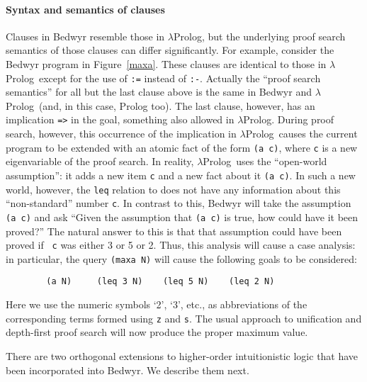 \documentclass{article}
\newcommand{\lp}{$\lambda$Prolog}
\begin{document}
\paragraph{Syntax and semantics of clauses}
Clauses in Bedwyr resemble those in \lp, but the underlying proof
search semantics of those clauses can differ significantly.  For example,
consider the Bedwyr program in Figure~\ref{maxa}.  These clauses are
identical to those in \lp\ except for the use of \verb+:=+ instead of
\verb+:-+.  Actually the ``proof search semantics'' for all but the
last clause above is the same in Bedwyr and \lp\ (and, in this case,
Prolog too).  The last clause, however, has an implication \verb+=>+
in the goal, something also allowed in \lp.  During proof search,
however, this occurrence of the implication in \lp\ causes the current
program to be extended with an atomic fact of the form \verb+(a c)+,
where {\tt c} is a new eigenvariable of the proof search.  In reality,
\lp\ uses the ``open-world assumption'': it adds a new item {\tt c}
and a new fact about it {\tt (a c)}.  In such a new world, however, the
{\tt leq} relation to does not have any information about this
``non-standard'' number {\tt c}.  In contrast to this, Bedwyr will
take the assumption  {\tt (a c)} and ask ``Given the assumption that
{\tt (a c)} is true, how could have it been proved?''  The natural
answer to this is that that assumption could have been proved if {\tt
c} was either 3 or 5 or 2.  Thus, this analysis will cause a case
analysis: in particular, the query {\tt (maxa N)} will cause the
following goals to be considered:
\begin{verbatim}
        (a N)     (leq 3 N)    (leq 5 N)    (leq 2 N)
\end{verbatim}
Here we use the numeric symbols `2', `3', etc., as abbreviations of
the corresponding terms formed using \texttt{z} and \texttt{s}.
The usual approach to unification and depth-first proof search will
now produce the proper maximum value.

\bigskip
There are two orthogonal extensions to higher-order intuitionistic
logic that have been incorporated into Bedwyr.   We describe them next.
\end{document}
